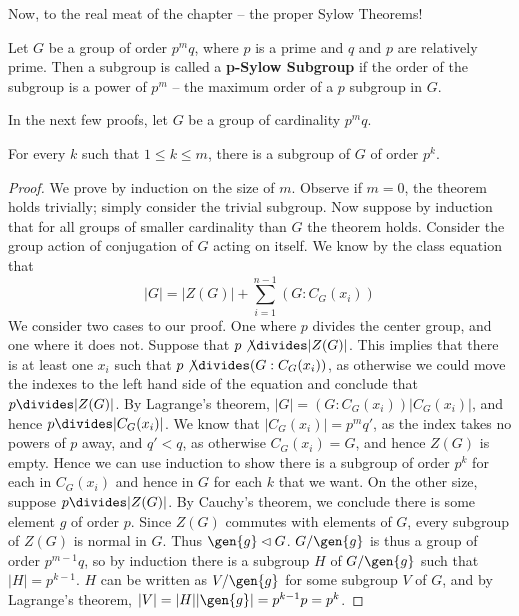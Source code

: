 Now, to the real meat of the chapter -- the proper Sylow Theorems!

\begin{definition}
    Let $G$ be a group of order $p^mq$, where $p$ is a prime and $q$ and $p$ are relatively prime. Then a subgroup is called a {\bf p-Sylow Subgroup}  if the order of the subgroup is a power of $p^m$ -- the maximum order of a $p$ subgroup in $G$.
\end{definition}

In the next few proofs, let $G$ be a group of cardinality $p^mq$.

\begin{lemma}
    For every $k$ such that $1 \leq k \leq m$, there is a subgroup of $G$ of order $p^k$.
\end{lemma}
\begin{proof}
    We prove by induction on the size of $m$. Observe if $m = 0$, the theorem holds trivially; simply consider the trivial subgroup. Now suppose by induction that for all groups of smaller cardinality than $G$ the theorem holds. Consider the group action of conjugation of $G$ acting on itself. We know by the class equation that
    \[ |G| = |Z(G)| + \sum_{i = 1}^{n-1} (G:C_G(x_i)) \]
    We consider two cases to our proof. One where $p$ divides the center group, and one where it does not. Suppose that $p \not\divides |Z(G)|$. This implies that there is at least one $x_i$ such that $p \not \divides (G:C_G(x_i))$, as otherwise we could move the indexes to the left hand side of the equation and conclude that $p \divides|Z(G)|$. By Lagrange's theorem, $|G| = (G:C_G(x_i))|C_G(x_i)|$, and hence $p \divides |C_G(x_i)|$. We know that $|C_G(x_i)| = p^{m}q'$, as the index takes no powers of $p$ away, and $q' < q$, as otherwise $C_G(x_i) = G$, and hence $Z(G)$ is empty. Hence we can use induction to show there is a subgroup of order $p^k$ for each in $C_G(x_i)$ and hence in $G$ for each $k$ that we want. On the other size, suppose $p \divides |Z(G)|$. By Cauchy's theorem, we conclude there is some element $g$ of order $p$. Since $Z(G)$ commutes with elements of $G$, every subgroup of $Z(G)$ is normal in $G$. Thus $\gen{g} \lhd G$. $G/\gen{g}$ is thus a group of order $p^{m-1}q$, so by induction there is a subgroup $H$ of $G/\gen{g}$ such that $|H| = p^{k-1}$. $H$ can be written as $V/\gen{g}$ for some subgroup $V$ of $G$, and by Lagrange's theorem, $|V| = |H||\gen{g}| = p^{k-1}p = p^k$.
\end{proof}

